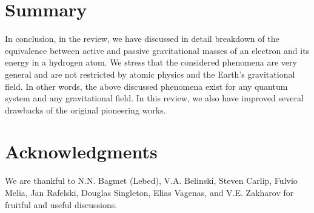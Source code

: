 \documentclass{ws-ijmpd}
\begin{document}
\section{Summary}
In conclusion, in the review, we have discussed in detail breakdown of
 the equivalence between active and passive gravitational masses of
 an electron and its energy in a hydrogen atom. We stress that the considered phenomena are very general and are not restricted by atomic physics and the Earth's gravitational field. In other words, the above discussed phenomena exist for any quantum system and any gravitational field.  In this review, we also have improved several drawbacks of the original pioneering works.  


\section*{Acknowledgments}

We are thankful to N.N. Bagmet (Lebed), V.A. Belinski, Steven
Carlip, Fulvio Melia, Jan Rafelski, Douglas Singleton, Elias Vagenas, and V.E. Zakharov for fruitful and useful discussions. 
\end{document}
